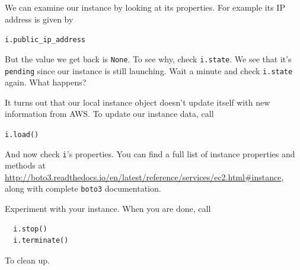 \documentclass{article}
\begin{document}
We can examine our instance by looking at its properties.  For example its IP address is given by 

\texttt{i.public\_ip\_address}

But the value we get back is \texttt{None}.  To see why, check \texttt{i.state}.  We see that it's \texttt{pending} since our instance is still launching.  Wait a minute and check \texttt{i.state} again. What happens?

It turns out that our local instance object doesn't update itself with new information from AWS.  To update our instance data, call

\texttt{i.load()}

And now check \texttt{i}'s properties.  You can find a full list of instance properties and methods at \url{http://boto3.readthedocs.io/en/latest/reference/services/ec2.html#instance}, along with complete \texttt{boto3} documentation.

\newpage

Experiment with your instance.  When you are done, call

\begin{verbatim}
  i.stop()
  i.terminate()
  \end{verbatim}
  
  To clean up.
\end{document}
